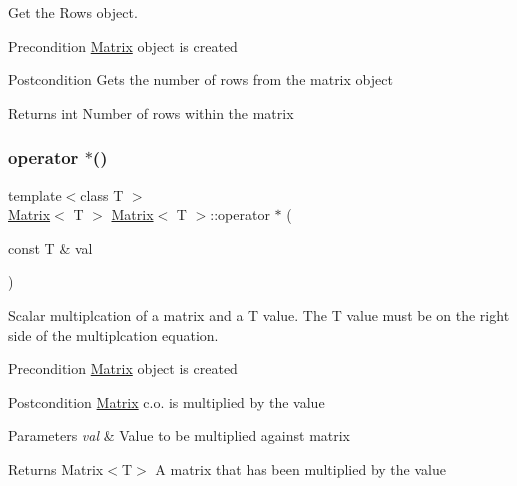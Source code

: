 Get the Rows object. 

\begin{DoxyPrecond}{Precondition}
\mbox{\hyperlink{class_matrix}{Matrix}} object is created 
\end{DoxyPrecond}
\begin{DoxyPostcond}{Postcondition}
Gets the number of rows from the matrix object 
\end{DoxyPostcond}
\begin{DoxyReturn}{Returns}
int Number of rows within the matrix 
\end{DoxyReturn}
\mbox{\label{class_matrix_a7754aef3ca206db6fb054088ba90409f}} 
\subsubsection{\texorpdfstring{operator $\ast$()}{operator *()}}
{\footnotesize\ttfamily template$<$class T $>$ \\
\mbox{\hyperlink{class_matrix}{Matrix}}$<$ T $>$ \mbox{\hyperlink{class_matrix}{Matrix}}$<$ T $>$\+::operator $\ast$ (\begin{DoxyParamCaption}\item[{const T \&}]{val }\end{DoxyParamCaption})}



Scalar multiplcation of a matrix and a T value. The T value must be on the right side of the multiplcation equation. 

\begin{DoxyPrecond}{Precondition}
\mbox{\hyperlink{class_matrix}{Matrix}} object is created 
\end{DoxyPrecond}
\begin{DoxyPostcond}{Postcondition}
\mbox{\hyperlink{class_matrix}{Matrix}} c.\+o. is multiplied by the value 
\end{DoxyPostcond}

\begin{DoxyParams}{Parameters}
{\em val} & Value to be multiplied against matrix \\
\hline
\end{DoxyParams}
\begin{DoxyReturn}{Returns}
Matrix$<$\+T$>$ A matrix that has been multiplied by the value 
\end{DoxyReturn}
\mbox{\label{class_matrix_a33c00fb6f2e9401d17d9ed615b965634}} 
